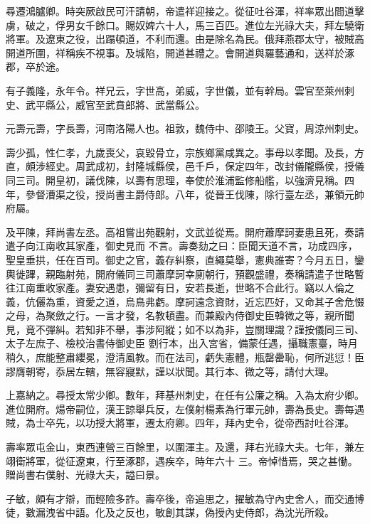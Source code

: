 \begin{pinyinscope}
 尋遷鴻臚卿。時突厥啟民可汗請朝，帝遣祥迎接之。從征吐谷渾，祥率眾出間道擊虜，破之，俘男女千餘口。賜奴婢六十人，馬三百匹。進位左光祿大夫，拜左驍衛將軍。及遼東之役，出蹋頓道，不利而還。由是除名為民。俄拜燕郡太守，被賊高開道所圍，祥稱疾不視事。及城陷，開道甚禮之。會開道與羅藝通和，送祥於涿郡，卒於途。



 有子義隆，永年令。祥兄云，字世高，弟威，字世儀，並有幹局。雲官至萊州刺史、武平縣公，威官至武賁郎將、武當縣公。



 元壽元壽，字長壽，河南洛陽人也。祖敦，魏侍中、邵陵王。父寶，周涼州刺史。



 壽少孤，性仁孝，九歲喪父，哀毀骨立，宗族鄉黨咸異之。事母以孝聞。及長，方直，頗涉經史。周武成初，封隆城縣侯，邑千戶，保定四年，改封儀隴縣侯，授儀同三司。開皇初，議伐陳，以壽有思理，奉使於淮浦監修船艦，以強濟見稱。四年，參督漕渠之役，授尚書主爵侍郎。八年，從晉王伐陳，除行臺左丞，兼領元帥府屬。



 及平陳，拜尚書左丞。高祖嘗出苑觀射，文武並從焉。開府蕭摩訶妻患且死，奏請遣子向江南收其家產，御史見而
 不言。壽奏劾之曰：臣聞天道不言，功成四序，聖皇垂拱，任在百司。御史之官，義存糾察，直繩莫舉，憲典誰寄？今月五日，鑾輿徙蹕，親臨射苑，開府儀同三司蕭摩訶幸廁朝行，預觀盛禮，奏稱請遣子世略暫往江南重收家產。妻安遇患，彌留有日，安若長逝，世略不合此行。竊以人倫之義，伉儷為重，資愛之道，烏鳥弗虧。摩訶遠念資財，近忘匹好，又命其子舍危惙之母，為聚斂之行。一言才發，名教頓盡。而兼殿內侍御史臣韓微之等，親所聞見，竟不彈糾。若知非不舉，事涉阿縱；如不以為非，豈關理識？謹按儀同三司、太子左庶子、檢校治書侍御史臣
 劉行本，出入宮省，備蒙任遇，攝職憲臺，時月稍久，庶能整肅纓冕，澄清風教。而在法司，虧失憲體，瓶罄罍恥，何所逃愆！臣謬膺朝寄，忝居左轄，無容寢默，謹以狀聞。其行本、微之等，請付大理。



 上嘉納之。尋授太常少卿。數年，拜基州刺史，在任有公廉之稱。入為太府少卿。進位開府。煬帝嗣位，漢王諒舉兵反，左僕射楊素為行軍元帥，壽為長史。壽每遇賊，為士卒先，以功授大將軍，遷太府卿。四年，拜內史令，從帝西討吐谷渾。



 壽率眾屯金山，東西連營三百餘里，以圍渾主。及還，拜右光祿大夫。七年，兼左翊衛將軍，從征遼東，行至涿郡，遇疾卒，時年六十
 三。帝悼惜焉，哭之甚慟。贈尚書右僕射、光祿大夫，謚曰景。



 子敏，頗有才辯，而輕險多詐。壽卒後，帝追思之，擢敏為守內史舍人，而交通博徒，數漏洩省中語。化及之反也，敏創其謀，偽授內史侍郎，為沈光所殺。




\end{pinyinscope}
